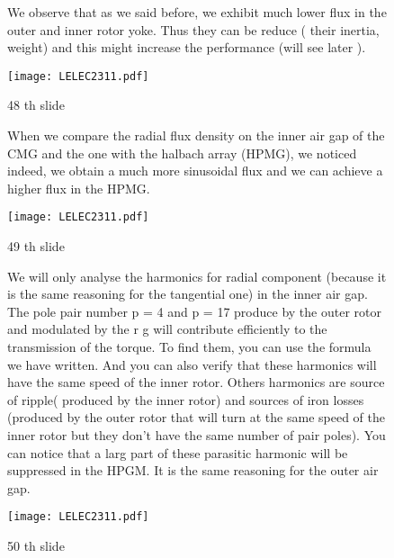 \begin{figure}[H]
    \begin{minipage}{.45\linewidth}
    We observe that as we said before, we exhibit much lower flux in the outer and inner rotor yoke. Thus they can be reduce ( their inertia, weight) and this might increase the performance (will see later ).
    \end{minipage}
    \hfill%
    \begin{minipage}[c]{.45\linewidth}
        \centering
        \texttt{[image: LELEC2311.pdf]}
        \caption{48 th slide}
    \end{minipage}
\end{figure}

\begin{figure}[H]
    \begin{minipage}{.45\linewidth}
   When we compare the radial flux density on the inner air gap of the CMG and the one with the halbach array (HPMG), we noticed indeed, we obtain a much more sinusoidal flux and we can achieve a higher flux in the HPMG.
    \end{minipage}
    \hfill%
    \begin{minipage}[c]{.45\linewidth}
        \centering
        \texttt{[image: LELEC2311.pdf]}
        \caption{49 th slide}
    \end{minipage}
\end{figure}

\begin{figure}[H]
    \begin{minipage}{.45\linewidth}
   We will only analyse the harmonics for radial component (because it is the same reasoning for the tangential one) in the inner air gap.
   The pole pair number p = 4 and p = 17 produce by the outer rotor and modulated by the r
 g will contribute efficiently to the transmission of the torque. To find them, you can use the formula we have written. And you can also verify that these harmonics will have the same speed of the inner rotor. Others harmonics are source of ripple( produced by the inner rotor) and sources of iron losses (produced by the outer rotor that will turn at the same speed of the inner rotor but they don't have the same number of pair poles). You can notice that a larg part of these parasitic harmonic will be suppressed in the HPGM.
   It is the same reasoning for the outer air gap.   \end{minipage}
    \hfill%
    \begin{minipage}[c]{.45\linewidth}
        \centering
        \texttt{[image: LELEC2311.pdf]}
        \caption{50 th slide}
    \end{minipage}
\end{figure}

